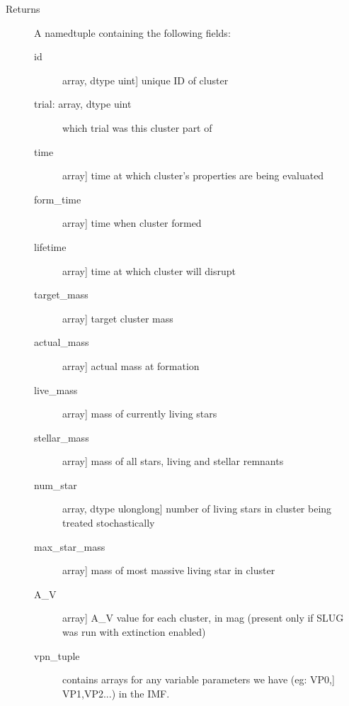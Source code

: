 \documentclass[letterpaper,10pt,english]{sphinxmanual}
\begin{document}
\begin{fulllineitems}
\begin{description}
\item[{Returns}] \leavevmode
A namedtuple containing the following fields:
\begin{description}
\item[{id}] \leavevmode{[}array, dtype uint{]}
unique ID of cluster

\item[{trial: array, dtype uint}] \leavevmode
which trial was this cluster part of

\item[{time}] \leavevmode{[}array{]}
time at which cluster's properties are being evaluated

\item[{form\_time}] \leavevmode{[}array{]}
time when cluster formed

\item[{lifetime}] \leavevmode{[}array{]}
time at which cluster will disrupt

\item[{target\_mass}] \leavevmode{[}array{]}
target cluster mass

\item[{actual\_mass}] \leavevmode{[}array{]}
actual mass at formation

\item[{live\_mass}] \leavevmode{[}array{]}
mass of currently living stars

\item[{stellar\_mass}] \leavevmode{[}array{]}
mass of all stars, living and stellar remnants

\item[{num\_star}] \leavevmode{[}array, dtype ulonglong{]}
number of living stars in cluster being treated stochastically

\item[{max\_star\_mass}] \leavevmode{[}array{]}
mass of most massive living star in cluster

\item[{A\_V}] \leavevmode{[}array{]}
A\_V value for each cluster, in mag (present only if SLUG was
run with extinction enabled)

\item[{vpn\_tuple}] \leavevmode{[}contains arrays for any variable parameters we have (eg: VP0,{]}
VP1,VP2...) in the IMF.

\end{description}

\end{description}

\end{fulllineitems}
\end{document}

